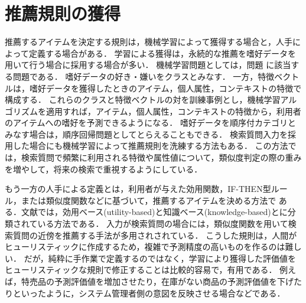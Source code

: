 \section{推薦規則の獲得}
\label{sec:cbfrule}

推薦するアイテムを決定する規則は，機械学習によって獲得する場合と，人手によって定義する場合がある．
学習による獲得は，永続的な推薦を嗜好データを用いて行う場合に採用する場合が多い．
機械学習問題としては，問題\cite{eb:053:00,jpublist:077x,jb:033:00,jb:035:00,trieice:06:04}
に該当する問題である．
嗜好データの好き・嫌いをクラスとみなす．
一方，特徴ベクトルは，嗜好データを獲得したときのアイテム，個人属性，コンテキストの特徴で構成する．
これらのクラスと特徴ベクトルの対を訓練事例とし，機械学習アルゴリズムを適用すれば，アイテム，個人属性，コンテキストの特徴から，利用者のアイテムへの嗜好を予測できるようになる．
嗜好データを順序付カテゴリとみなす場合は，順序回帰問題\cite{jb:025:00}としてとらえることもできる．
検索質問入力を採用した場合にも機械学習によって推薦規則を洗練する方法もある\cite{jair:04:01}．
この方法では，検索質問で頻繁に利用される特徴や属性値について，類似度判定の際の重みを増やして，将来の検索で重視するようにしている．

もう一方の人手による定義とは，利用者が与えた効用関数，IF-THEN型ルール，または類似度関数などに基づいて，推薦するアイテムを決める方法で
ある．文献\cite{ej:048}では，効用ベース(utility-based)と知識ベース(knowledge-based)とに分類されている方法である．
入力が検索質問の場合には，類似度関数を用いて検索質問の近傍を推薦する手法が多用されされている．
こうした規則は，人間がヒューリスティックに作成するため，複雑で予測精度の高いものを作るのは難しい．
だが，純粋に手作業で定義するのではなく，学習により獲得した評価値をヒューリスティックな規則で修正することは比較的容易で，有用である．
例えば，特売品の予測評価値を増加させたり，在庫がない商品の予測評価値を下げたりといったように，システム管理者側の意図を反映させる場合などである．

